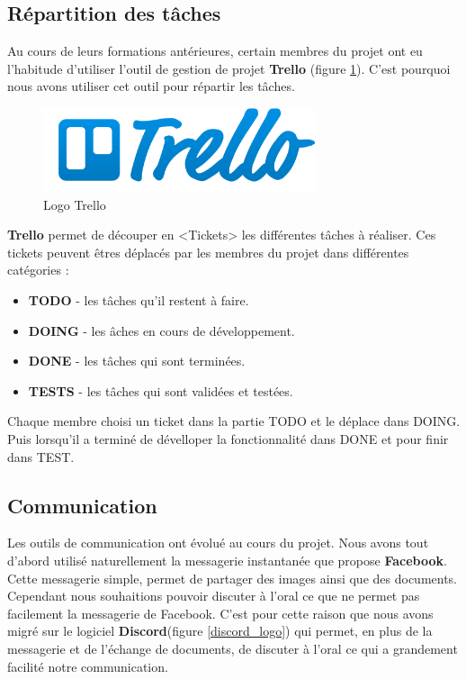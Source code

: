 \subsection{Répartition des tâches}
Au cours de leurs formations antérieures, certain membres du projet ont eu l'habitude d'utiliser l'outil de gestion de projet \textbf{Trello} (figure \ref{trello_logo}). C'est pourquoi nous avons utiliser cet outil pour répartir les tâches.\\

\begin{figure}[H]
\centering
\includegraphics[width=8cm]{images/activite/trelloLogo.png}
\caption{Logo Trello}
\label{trello_logo}
\end{figure}

\textbf{Trello} permet de découper en <Tickets> les différentes t\^aches à réaliser. Ces tickets peuvent \^etres déplacés par les membres du projet dans différentes catégories :

\begin{itemize}
\item \textbf{TODO} - les t\^aches qu'il restent à faire. 
\item \textbf{DOING} - les \^aches en cours de développement.
\item \textbf{DONE} - les t\^aches qui sont terminées.
\item \textbf{TESTS} - les t\^aches qui sont validées et testées.\\
\end{itemize}

Chaque membre choisi un ticket dans la partie TODO et le déplace dans DOING. Puis lorsqu'il a terminé de dévelloper la fonctionnalité dans DONE et pour finir dans TEST.



\subsection{Communication}
Les outils de communication ont évolué au cours du projet. Nous avons tout d'abord utilisé naturellement la messagerie instantanée que propose \textbf{Facebook}. Cette messagerie simple, permet de partager des images ainsi que des documents.
Cependant nous souhaitions pouvoir discuter à l'oral ce que ne permet pas facilement la messagerie de Facebook. C'est pour cette raison que nous avons migré sur le logiciel \textbf{Discord}(figure \ref{discord_logo}) qui permet, en plus de la messagerie et de l'échange de documents, de discuter à l'oral ce qui a grandement facilité notre communication.

